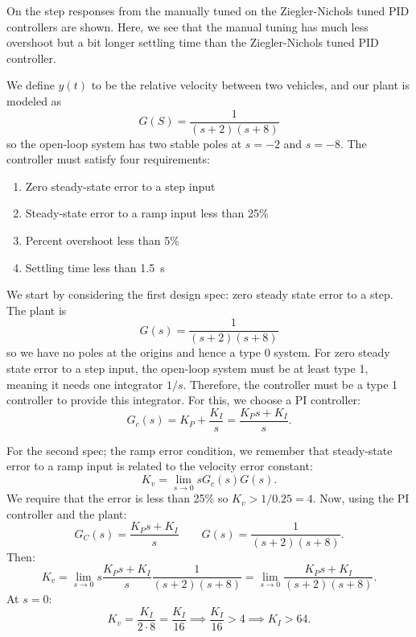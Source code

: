 On  the step responses from the manually tuned on the Ziegler-Nichols tuned PID controllers are shown. 
Here, we see that the manual tuning has much less overshoot but a bit longer settling time than the Ziegler-Nichols tuned PID controller.


\begin{exa}
  We define $y(t)$ to be the relative velocity between two vehicles, and our plant is modeled as
  \begin{equation*}
    G(S) = \frac{1}{(s+2)(s+8)}
  \end{equation*}
  so the open-loop system has two stable poles at $s = -2$ and $s = -8$. 
  The controller must satisfy four requirements:
  \begin{enumerate}
    \item Zero steady-state error to a step input
    \item Steady-state error to a ramp input less than 25\%
    \item Percent overshoot less than 5\%
    \item Settling time less than \qty{1,5}{\s} 
  \end{enumerate}
  \tcblower
  We start by considering the first design spec: zero steady state error to a step.
  The plant is
  \begin{equation*}
    G(s) = \frac{1}{(s+2)(s+8)}
  \end{equation*}
  so we have no poles at the origins and hence a type 0 system.
  For zero steady state error to a step input, the open-loop system must be at least type 1, meaning it needs one integrator $1 / s$. 
  Therefore, the controller must be a type 1 controller to provide this integrator.
  For this, we choose a PI controller:
  \begin{equation*}
    G_c(s) = K_P + \frac{K_I}{s} = \frac{K_P s + K_I}{s}
  .\end{equation*}
  
  For the second spec; the ramp error condition, we remember that steady-state error to a ramp input is related to the velocity error constant:
  \begin{equation*}
    K_v = \lim_{s \to 0}s G_c(s) G(s)
  .\end{equation*}
  We require that the error is less than 25\% so $K_v > 1 / \num{0,25}  = 4$.
  Now, using the PI controller and the plant:
  \begin{equation*}
    G_C(s) = \frac{K_P s + K_I}{s} \qquad G(s) = \frac{1}{(s+2)(s+8)}
  .\end{equation*}
  Then:
  \begin{equation*}
    K_v = \lim_{s \to 0} s \frac{K_P s + K_I}{s} \frac{1}{(s+2)(s+8)} = \lim_{s \to 0} \frac{K_P s + K_I}{(s+2)(s+8)}
  .\end{equation*}
  At $s = 0$:
  \begin{equation*}
    K_v = \frac{K_I}{2\cdot 8} = \frac{K_I}{16} \implies \frac{K_I}{16} > 4 \implies K_I > 64
  .\end{equation*}
  

\end{exa}
